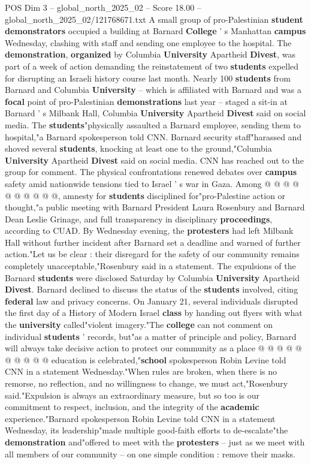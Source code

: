 \begin{textsample}{POS Dim 3 – global\_north\_2025\_02 – Score 18.00 – global\_north\_2025\_02/121768671.txt}  \label{ex:f3_pos_282}
A small group of pro-Palestinian \textbf{student} \textbf{demonstrators} occupied a building at Barnard \textbf{College} ' s Manhattan \textbf{campus} Wednesday, clashing with staff and sending one employee to the hospital.
The \textbf{demonstration}, \textbf{organized} by Columbia \textbf{University} Apartheid \textbf{Divest}, was part of a week of action demanding the reinstatement of two \textbf{students} expelled for disrupting an Israeli history course last month.
Nearly 100 \textbf{students} from Barnard and Columbia \textbf{University} -- which is affiliated with Barnard and was a \textbf{focal} point of pro-Palestinian \textbf{demonstrations} last year -- staged a sit-in at Barnard ' s Milbank Hall, Columbia \textbf{University} Apartheid \textbf{Divest} said on social media.
The \textbf{students}"physically assaulted a Barnard employee, sending them to hospital,"a Barnard spokesperson told CNN.
Barnard security staff"harassed and shoved several \textbf{students}, knocking at least one to the ground,"Columbia \textbf{University} Apartheid \textbf{Divest} said on social media.
CNN has reached out to the group for comment.
The physical confrontations renewed debates over \textbf{campus} safety amid nationwide tensions tied to Israel ' s war in Gaza.
Among @ @ @ @ @ @ @ @ @ @, amnesty for \textbf{students} disciplined for"pro-Palestine action or thought,"a public meeting with Barnard President Laura Rosenbury and Barnard Dean Leslie Grinage, and full transparency in disciplinary \textbf{proceedings}, according to CUAD.
By Wednesday evening, the \textbf{protesters} had left Milbank Hall without further incident after Barnard set a deadline and warned of further action."Let us be clear : their disregard for the safety of our community remains completely unacceptable,"Rosenbury said in a statement.
The expulsions of the Barnard \textbf{students} were disclosed Saturday by Columbia \textbf{University} Apartheid \textbf{Divest}.
Barnard declined to discuss the status of the \textbf{students} involved, citing \textbf{federal} law and privacy concerns.
On January 21, several individuals disrupted the first day of a History of Modern Israel \textbf{class} by handing out flyers with what the \textbf{university} called"violent imagery."The \textbf{college} can not comment on individual \textbf{students} ' records, but"as a matter of principle and policy, Barnard will always take decisive action to protect our community as a place @ @ @ @ @ @ @ @ @ @ education is celebrated,"\textbf{school} spokesperson Robin Levine told CNN in a statement Wednesday."When rules are broken, when there is no remorse, no reflection, and no willingness to change, we must act,"Rosenbury said."Expulsion is always an extraordinary measure, but so too is our commitment to respect, inclusion, and the integrity of the \textbf{academic} experience."Barnard spokesperson Robin Levine told CNN in a statement Wednesday, its leadership"made multiple good-faith efforts to de-escalate"the \textbf{demonstration} and"offered to meet with the \textbf{protesters} -- just as we meet with all members of our community -- on one simple condition : remove their masks.

\end{textsample}
